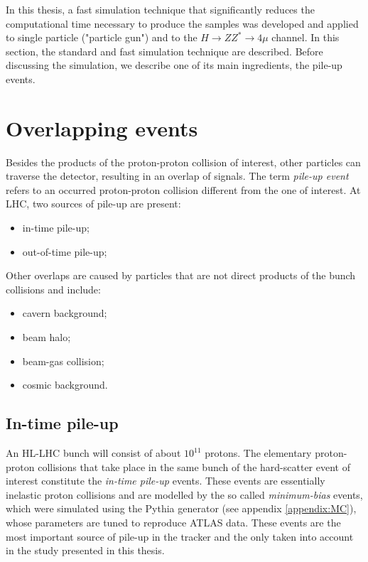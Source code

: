 \documentclass[a4paper,twoside,12pt]{book}
\begin{document}
In this thesis, a fast simulation technique that
significantly reduces the computational time necessary to produce the samples was developed and applied to single particle ("particle gun") and to the $H \rightarrow ZZ^{*} \rightarrow 4\mu$ channel. In this section, the standard and fast simulation technique are described. Before discussing the simulation, we describe one of its main ingredients, 
the pile-up events. 

\section{Overlapping events}
Besides the products of the proton-proton collision of interest, other particles can traverse the detector, resulting in an overlap of signals. The term \textit{pile-up event} refers to an occurred proton-proton collision different from the one of interest. At LHC, two sources of pile-up are present:

\begin{itemize}
\item in-time pile-up;
\item out-of-time pile-up;
\end{itemize}

Other overlaps are caused by particles that are not direct products of the bunch collisions and include:

\begin{itemize}
\item cavern background;
\item beam halo;
\item beam-gas collision;
\item cosmic background.
\end{itemize}

\subsection*{In-time pile-up}
An HL-LHC bunch will consist of about $10^{11}$ protons. The elementary
proton-proton collisions that take place in the same bunch of the hard-scatter event of
interest constitute the \textit{in-time pile-up} events. These events are essentially inelastic proton collisions and are modelled by the so called
\textit{minimum-bias} events, which were simulated using the Pythia generator (see appendix \ref{appendix:MC}), whose parameters
are tuned to reproduce ATLAS data. These events are the most
important source of pile-up in the tracker and the only taken into account in the study presented in this thesis. \\
\end{document}
